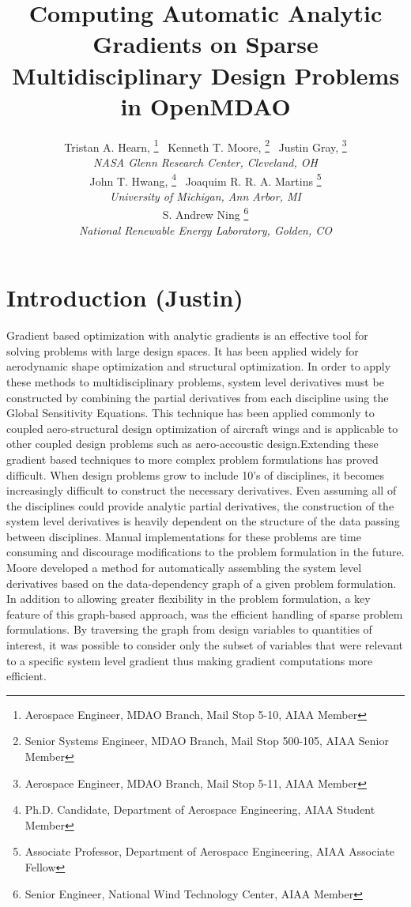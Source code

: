 \documentclass[]{aiaa-tc} %
\title{Computing Automatic Analytic Gradients on Sparse Multidisciplinary Design Problems in OpenMDAO}
\author{
  Tristan A. Hearn,%
     \thanks{Aerospace Engineer, MDAO Branch, Mail Stop 5-10, AIAA Member}
  \ Kenneth T. Moore,%
     \thanks{Senior Systems Engineer, MDAO Branch, Mail Stop 500-105, AIAA Senior Member}
  \ Justin Gray,%
     \thanks{Aerospace Engineer, MDAO Branch, Mail Stop 5-11, AIAA Member}
   \\
  {\normalsize\itshape
  NASA Glenn Research Center, Cleveland, OH}  \\
  John T. Hwang,%
  \thanks{Ph.D. Candidate, Department of Aerospace Engineering, AIAA Student Member}
  \ Joaquim R. R. A. Martins%
  \thanks{Associate Professor, Department of Aerospace Engineering, AIAA Associate Fellow}
  \\
  {\normalsize\itshape
   University of Michigan, Ann Arbor, MI}\\
  S. Andrew Ning
    \thanks{Senior Engineer, National Wind Technology Center, AIAA Member}
  \\
  {\normalsize\itshape
   National Renewable Energy Laboratory, Golden, CO}
}
\begin{document}
  \maketitle

  \begin{abstract}

  \end{abstract}

  \section{Introduction (Justin)}

    Gradient based optimization with analytic gradients is an effective tool for solving problems
    with large design spaces. It has been applied widely for aerodynamic shape optimization \cite{Liou2010,palacios2012adjoint}
    and structural optimization\cite{Kennedy:2013:TACS, Venkataraman:2004:SOC, Adelman:1986:structure-sensitivity}.
    In order to apply these methods to multidisciplinary problems, system level derivatives must be
    constructed by combining the partial derivatives from each discipline using the Global Sensitivity
    Equations\cite{Sobieski1990}. This technique has been applied commonly to coupled
    aero-structural design optimization of aircraft wings\cite{Kenway2012c, Haghighat2012} and is applicable to
    other coupled design problems such as aero-accoustic design\cite{economon2012coupled}.Extending these
    gradient based techniques to more complex problem formulations has proved difficult. When
    design problems grow to include 10's of disciplines, it becomes increasingly difficult to construct the
    necessary derivatives. Even assuming all of the disciplines could provide analytic partial derivatives,
    the construction of the system level derivatives is heavily dependent on the structure of the data passing
    between disciplines. Manual implementations for these problems are time consuming and discourage modifications
    to the problem formulation in the future. Moore developed a method for automatically assembling the system
    level derivatives based on the data-dependency graph of a given problem formulation\cite{openmdao_derivatives}.
    In addition to allowing greater flexibility in the problem formulation, a key feature of this graph-based approach, was the efficient
    handling of sparse problem formulations. By traversing the graph from design variables to quantities of interest,
    it was possible to consider only the subset of variables that were relevant to a specific system level gradient thus
    making gradient computations more efficient.
\end{document}
